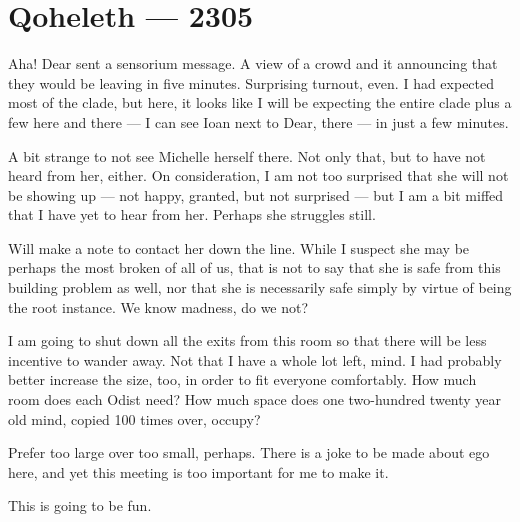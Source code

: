 \hypertarget{qoheleth-2305}{%
\chapter*{Qoheleth — 2305}\label{qoheleth-2305}}

Aha! Dear sent a sensorium message. A view of a crowd and it announcing that they would be leaving in five minutes. Surprising turnout, even. I had expected most of the clade, but here, it looks like I will be expecting the entire clade plus a few here and there — I can see Ioan next to Dear, there — in just a few minutes.

A bit strange to not see Michelle herself there. Not only that, but to have not heard from her, either. On consideration, I am not too surprised that she will not be showing up — not happy, granted, but not surprised — but I am a bit miffed that I have yet to hear from her. Perhaps she struggles still.

Will make a note to contact her down the line. While I suspect she may be perhaps the most broken of all of us, that is not to say that she is safe from this building problem as well, nor that she is necessarily safe simply by virtue of being the root instance. We know madness, do we not?

I am going to shut down all the exits from this room so that there will be less incentive to wander away. Not that I have a whole lot left, mind. I had probably better increase the size, too, in order to fit everyone comfortably. How much room does each Odist need? How much space does one two-hundred twenty year old mind, copied 100 times over, occupy?

Prefer too large over too small, perhaps. There is a joke to be made about ego here, and yet this meeting is too important for me to make it.

This is going to be fun.
